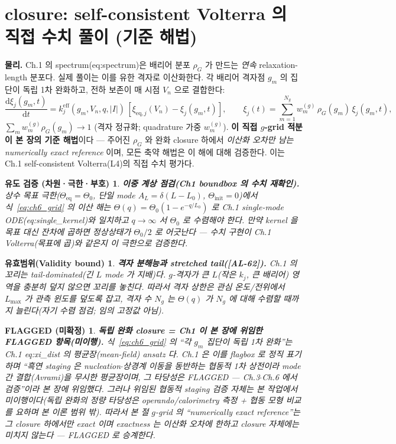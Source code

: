 \documentclass[11pt,a4paper]{article}
\newtheorem*{boundbox}{유효범위(Validity bound)}
\newtheorem*{flagbox}{FLAGGED (미확정)}
\newtheorem*{verifybox}{유도 검증 (차원·극한·부호)}
\newcommand{\dd}{\mathrm{d}}
\newcommand{\eff}{\mathrm{eff}}
\newcommand{\eq}{\mathrm{eq}}
\newcommand{\AL}[1]{\textsf{[AL-#1]}}
\begin{document}
\section{closure: self-consistent Volterra 의 직접 수치 풀이 (기준 해법)}\label{sec:ch6_grid}
\textbf{물리.} Ch.1 의 spectrum(eq:spectrum)은 배리어 분포 $\rho_G$ 가 만드는 \emph{연속} relaxation-length 분포다.
실제 풀이는 이를 유한 격자로 이산화한다. 각 배리어 격자점 $g_m$ 의 집단이 독립 1차 완화하고, 전하 보존이 매
시점 $V_n$ 으로 결합한다:
\begin{equation}
\frac{\dd\xi_j(g_m,t)}{\dd t}=k_j^{\eff}(g_m,V_n,q,|I|)\,[\xi_{\eq,j}(V_n)-\xi_j(g_m,t)],\qquad
\xi_j(t)=\sum_{m=1}^{N_g}w_m^{(g)}\,\rho_G(g_m)\,\xi_j(g_m,t),
\label{eq:ch6_grid}
\end{equation}
$\sum_m w_m^{(g)}\rho_G(g_m)\to1$ (격자 정규화; quadrature 가중 $w_m^{(g)}$). \textbf{이 직접 $g$-grid 적분이 본
장의 기준 해법}이다 — 주어진 $\rho_G$ 와 완화 closure 하에서 \emph{이산화 오차만 남는 numerically exact reference}
이며, 모든 축약 해법은 이 해에 대해 검증한다. 이는 Ch.1 self-consistent Volterra(L4)의 직접 수치 평가다.
\begin{verifybox}
\textbf{이중 계상 점검(Ch1 boundbox 의 수치 재확인).} 상수 목표 극한($\Theta_\eq=\Theta_0$, 단일 mode
$A_L=\delta(L-L_0)$, $\Theta_\mathrm{init}=0$)에서 식~\eqref{eq:ch6_grid} 의 이산 해는 $\Theta(q)=\Theta_0
(1-e^{-q/L_0})$ 로 Ch.1 single-mode ODE(eq:single\_kernel)와 일치하고 $q\to\infty$ 서 $\Theta_0$ 로 수렴해야
한다. 만약 kernel 을 \emph{목표} 대신 \emph{잔차}에 곱하면 정상상태가 $\Theta_0/2$ 로 어긋난다 — 수치 구현이
Ch.1 Volterra(목표에 곱)와 같은지 이 극한으로 검증한다.
\end{verifybox}
\begin{boundbox}
\textbf{격자 분해능과 stretched tail(\AL{62}).} Ch.1 의 꼬리는 \emph{tail-dominated}(긴 $L$ mode 가 지배)다.
$g$-격자가 큰 $L$(작은 $k_j$, 큰 배리어) 영역을 충분히 덮지 않으면 꼬리를 놓친다. 따라서 격자 상한은 관심
온도/전위에서 $L_{\max}$ 가 관측 윈도를 덮도록 잡고, 격자 수 $N_g$ 는 $\Theta(q)$ 가 $N_g$ 에 대해 수렴할 때까지
늘린다(자기 수렴 점검; 임의 고정값 아님).
\end{boundbox}
\begin{flagbox}
\textbf{독립 완화 closure = Ch1 이 본 장에 위임한 FLAGGED 항목(미이행).} 식~\eqref{eq:ch6_grid} 의 ``각 $g_m$ 집단이
\emph{독립} 1차 완화''는 Ch.1 eq:xi\_dist 의 평균장(mean-field) ansatz 다. Ch.1 은 이를 flagbox 로 정직 표기하며
``흑연 staging 은 nucleation$\cdot$상경계 이동을 동반하는 \emph{협동적} 1차 상전이라 mode 간 결합(Avrami)을 무시한
평균장이며, 그 타당성은 FLAGGED — Ch.3$\cdot$Ch.6 에서 검증''이라 \emph{본 장에} 위임했다. 그러나 위임된 \emph{협동적
staging 검증 자체는 본 작업에서 미이행}이다(독립 완화의 정량 타당성은 operando/calorimetry 측정 + 협동 모형 비교를
요하며 본 이론 범위 밖). 따라서 본 절 $g$-grid 의 ``numerically exact reference''는 그 closure \emph{하에서만}
exact 이며 \emph{exactness 는 이산화 오차에 한하고 closure 자체에는 미치지 않는다} — FLAGGED 로 승계한다.
\end{flagbox}
\end{document}
